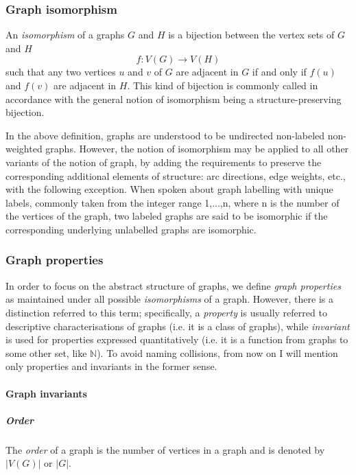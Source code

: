     \subsubsection{Graph isomorphism}
        
      An \emph{isomorphism} of a graphs $G$ and $H$ is a bijection between the vertex sets of $G$ and $H$
      $$f: V(G) \rightarrow V(H)$$
      such that any two vertices $u$ and $v$ of $G$ are adjacent in $G$ if and only if $f(u)$ and $f(v)$ are adjacent in $H$. This kind of bijection is commonly called  in accordance with the general notion of isomorphism being a structure-preserving bijection.
        
      In the above definition, graphs are understood to be undirected non-labeled non-weighted graphs. However, the notion of isomorphism may be applied to all other variants of the notion of graph, by adding the requirements to preserve the corresponding additional elements of structure: arc directions, edge weights, etc., with the following exception. When spoken about graph labelling with unique labels, commonly taken from the integer range 1,...,n, where n is the number of the vertices of the graph, two labeled graphs are said to be isomorphic if the corresponding underlying unlabelled graphs are isomorphic.

    \subsubsection{Graph properties}

      In order to focus on the abstract structure of graphs, we define \emph{graph properties} as maintained under all possible \emph{isomorphisms} of a graph. However, there is a distinction referred to this term; specifically, a \emph{property} is usually referred to descriptive characterisations of graphs (i.e. it is a class of graphs), while \emph{invariant} is used for properties expressed quantitatively (i.e. it is a function from graphs to some other set, like $\mathbb{N}$). To avoid naming collisions, from now on I will mention only properties and invariants in the former sense. 

      \paragraph{Graph invariants}

        \subparagraph{Order}

          The \emph{order} of a graph is the number of vertices in a graph and is denoted by $|V(G)|$ or $|G|$.
            
